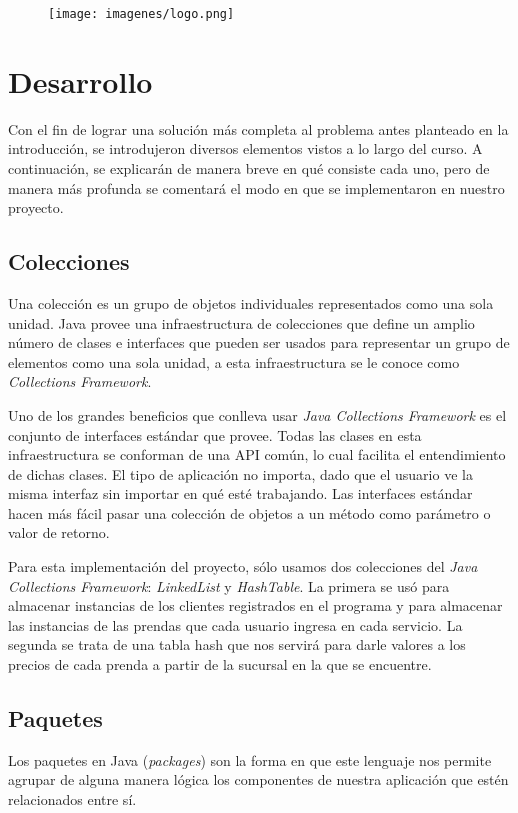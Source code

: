 \documentclass[12pt]{article}
\begin{document}
\begin{figure}[H]
\centering
\texttt{[image: imagenes/logo.png]}
\caption{}
\end{figure} 
 
\section{Desarrollo}
Con el fin de lograr una solución más completa al problema antes planteado en la introducción, se introdujeron diversos elementos vistos a lo largo del curso. A continuación, se explicarán de manera breve en qué consiste cada uno, pero de manera más profunda se comentará el modo en que se implementaron en nuestro proyecto.

\subsection{Colecciones}
Una colección es un grupo de objetos individuales representados como una sola unidad. Java provee una infraestructura de colecciones que define un amplio número de clases e interfaces que pueden ser usados para representar un grupo de elementos como una sola unidad, a esta infraestructura se le conoce como \textit{Collections Framework}.

\par Uno de los grandes beneficios que conlleva usar \textit{Java Collections Framework} es el conjunto de interfaces estándar que provee. Todas las clases en esta infraestructura se conforman de una API común, lo cual facilita el entendimiento de dichas clases. El tipo de aplicación no importa, dado que el usuario ve la misma interfaz sin importar en qué esté trabajando. Las interfaces estándar hacen más fácil pasar una colección de objetos a un método como parámetro o valor de retorno. 

\par Para esta implementación del proyecto, sólo usamos dos colecciones del \textit{Java Collections Framework}: \textit{LinkedList} y \textit{HashTable}. La primera se usó para almacenar instancias de los clientes registrados en el programa y para almacenar las instancias de las prendas que cada usuario ingresa en cada servicio. La segunda se trata de una tabla hash que nos servirá para darle valores a los precios de cada prenda a partir de la sucursal en la que se encuentre.

\subsection{Paquetes}
Los paquetes en Java (\textit{packages}) son la forma en que este lenguaje nos permite agrupar de alguna manera lógica los componentes de nuestra aplicación que estén relacionados entre sí.
\end{document}
